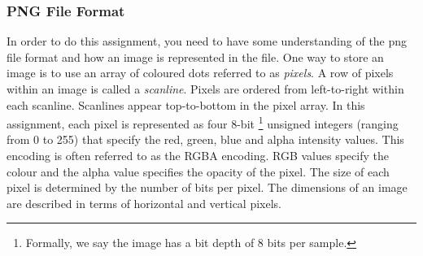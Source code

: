 \subsubsection{PNG File Format}
\label{subsec_PNG_File_Format}
In order to do this assignment, you need to have some understanding of the png file format and how an image is represented in the file. One way to store an image is to use an array of coloured dots referred to as {\em pixels}. A row of pixels within an image is called a {\em scanline}. Pixels are ordered from left-to-right within each scanline. Scanlines appear top-to-bottom in the pixel array. In this assignment, each pixel is represented as four 8-bit
\footnote{Formally, we say the image has a bit depth of 8 bits per sample.}
unsigned integers (ranging from 0 to 255) that specify the red, green, blue and alpha intensity values. This encoding is often referred to as the RGBA encoding. RGB values specify the colour and the alpha value specifies the opacity of the pixel. The size of each pixel is determined by the number of bits per pixel. The dimensions of an image are described in terms of horizontal and vertical pixels. 

\begin{figure}[h]  
\centering
{}
\end{figure}

